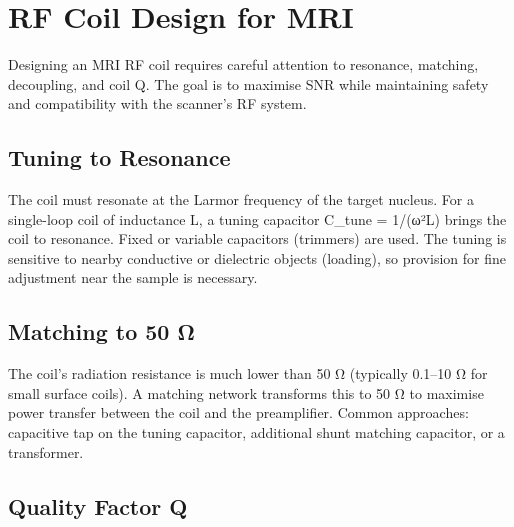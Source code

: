\section{RF Coil Design for MRI}\label{sec:wiki_coil_design}



Designing an MRI RF coil requires careful attention to resonance, matching, decoupling, and coil Q. The goal is to maximise SNR while maintaining safety and compatibility with the scanner's RF system.

				

\subsection{Tuning to Resonance}

				

The coil must resonate at the Larmor frequency of the target nucleus. For a single-loop coil of inductance L, a tuning capacitor C\_tune = 1/(ω²L) brings the coil to resonance. Fixed or variable capacitors (trimmers) are used. The tuning is sensitive to nearby conductive or dielectric objects (loading), so provision for fine adjustment near the sample is necessary.


				

\subsection{Matching to 50 Ω}

				


				

The coil's radiation resistance is much lower than 50 Ω (typically 0.1–10 Ω for small surface coils). A matching network transforms this to 50 Ω to maximise power transfer between the coil and the preamplifier. Common approaches: capacitive tap on the tuning capacitor, additional shunt matching capacitor, or a transformer.

				

\subsection{Quality Factor Q}

